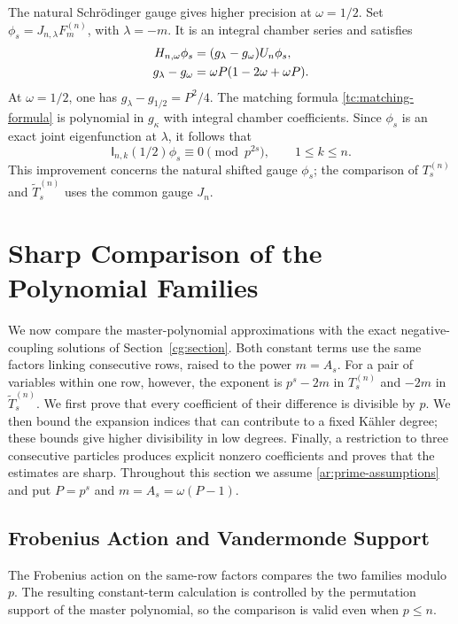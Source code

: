 \documentclass[11pt]{amsart}
\theoremstyle{definition}
\theoremstyle{remark}
\numberwithin{equation}{section}
\begin{document}
The natural Schr\"odinger gauge gives higher precision at
$\omega=1/2$. Set
$\phi_s=J_{n,\lambda}F_m^{(n)}$, with $\lambda=-m$. It is an
integral chamber series and satisfies
\begin{align}\label{pt:physical-residual}
 H_{n,\omega}\phi_s&=(g_\lambda-g_\omega)U_n\phi_s,\\
 g_\lambda-g_\omega&=\omega P(1-2\omega+\omega P).
 \notag
\end{align}
At $\omega=1/2$, one has $g_\lambda-g_{1/2}=P^2/4$.
The matching formula \eqref{tc:matching-formula} is polynomial
in $g_\kappa$ with integral chamber coefficients. Since
$\phi_s$ is an exact joint eigenfunction at $\lambda$, it follows
that
\begin{equation}\label{pt:half-coupling-full}
 \mathsf I_{n,k}(1/2)\phi_s\equiv0\pmod{p^{2s}},
 \qquad 1\leq k\leq n.
\end{equation}
This improvement concerns the natural shifted gauge $\phi_s$;
the comparison of $T_s^{(n)}$ and $\widetilde T_s^{(n)}$ uses the
common gauge $J_n$.


\section{Sharp Comparison of the Polynomial Families}
\label{pt:section}
We now compare the master-polynomial approximations with the exact
negative-coupling solutions of Section~\ref{cg:section}.
Both constant terms use the same factors linking consecutive
rows, raised to the power $m=A_s$. For a pair of variables
within one row, however, the exponent is $p^s-2m$ in $T_s^{(n)}$
and $-2m$ in $\widetilde T_s^{(n)}$.
We first prove that every coefficient of their difference is
divisible by $p$. We then bound the expansion indices that can
contribute to a fixed K\"ahler degree; these bounds give higher
divisibility in low degrees. Finally, a restriction to three
consecutive particles produces explicit nonzero coefficients
and proves that the estimates are sharp.
Throughout this section we assume \eqref{ar:prime-assumptions}
and put $P=p^s$ and $m=A_s=\omega(P-1)$.

\subsection{Frobenius Action and Vandermonde Support}
The Frobenius action on the same-row factors compares the two
families modulo $p$. The resulting constant-term calculation is
controlled by the permutation support of the master polynomial,
so the comparison is valid even when $p\leq n$.
\end{document}
